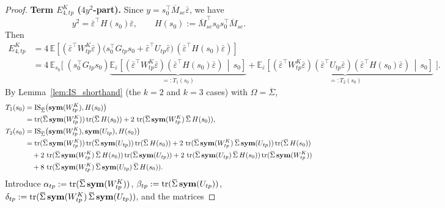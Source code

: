 \begin{proof}
\medskip
\noindent\textbf{Term $E^{K}_{4,tp}$ ($4y^2$-part).}
Since $y=s_0^\top\overline M_{se}\bar\varepsilon$, we have
\[
y^2=\bar\varepsilon^\top H(s_0)\bar\varepsilon,\qquad
H(s_0):=\overline M_{se}^\top s_0 s_0^\top\overline M_{se}.
\]
Then
\begin{align}
E^{K}_{4,tp}
&=4\,\mathbb E \left[(\bar\varepsilon^\top W^K_{tp}\bar\varepsilon)\Big(s_0^\top G_{tp}s_0+\bar\varepsilon^\top U_{tp}\bar\varepsilon\Big)\,(\bar\varepsilon^\top H(s_0)\bar\varepsilon)\right]\nonumber\\
&=4\,\mathbb E_{s_0} \Bigg[\;
(s_0^\top G_{tp}s_0)\underbrace{\mathbb E_{\bar\varepsilon}\left[(\bar\varepsilon^\top W^K_{tp}\bar\varepsilon)(\bar\varepsilon^\top H(s_0)\bar\varepsilon)\,\middle|\,s_0\right]}_{=:T_1(s_0)}
+\underbrace{\mathbb E_{\bar\varepsilon} \left[(\bar\varepsilon^\top W^K_{tp}\bar\varepsilon)(\bar\varepsilon^\top U_{tp}\bar\varepsilon)(\bar\varepsilon^\top H(s_0)\bar\varepsilon)\,\middle|\,s_0\right]}_{=:T_2(s_0)}
\;\Bigg].\label{eq:Dtp_cond_expand}
\end{align}
By Lemma~\ref{lem:IS_shorthand} (the $k=2$ and $k=3$ cases) with $\Omega=\overline\Sigma$,
\begin{align}
T_1(s_0)
&=\mathrm{IS}_{\overline\Sigma}\big(\symfun(W^K_{tp}),H(s_0)\big)\notag\\
&=\tr(\overline\Sigma\,\symfun(W^K_{tp}))\tr(\overline\Sigma\,H(s_0))
+2\,\tr(\overline\Sigma\,\symfun(W^K_{tp})\,\overline\Sigma\,H(s_0)),\label{eq:T1_expand}\\
T_2(s_0)
&=\mathrm{IS}_{\overline\Sigma}\big(\symfun(W^K_{tp}),\symfun(U_{tp}),H(s_0)\big)\notag\\
&=\tr(\overline\Sigma\,\symfun(W^K_{tp}))\tr(\overline\Sigma\,\symfun(U_{tp}))\tr(\overline\Sigma\,H(s_0))
+2\,\tr(\overline\Sigma\,\symfun(W^K_{tp})\,\overline\Sigma\,\symfun(U_{tp}))\tr(\overline\Sigma\,H(s_0))\notag\\
&\quad
+2\,\tr(\overline\Sigma\,\symfun(W^K_{tp})\,\overline\Sigma\,H(s_0))\tr(\overline\Sigma\,\symfun(U_{tp}))
+2\,\tr(\overline\Sigma\,\symfun(U_{tp})\,\overline\Sigma\,H(s_0))\tr(\overline\Sigma\,\symfun(W^K_{tp}))\notag\\
&\quad
+8\,\tr(\overline\Sigma\,\symfun(W^K_{tp})\,\overline\Sigma\,\symfun(U_{tp})\,\overline\Sigma\,H(s_0)).\label{eq:T2_expand}
\end{align}
Introduce $\alpha_{tp}:=\tr(\overline\Sigma\,\symfun(W^K_{tp}))$, $\beta_{tp}:=\tr(\overline\Sigma\,\symfun(U_{tp}))$,
$\delta_{tp}:=\tr(\overline\Sigma\,\symfun(W^K_{tp})\,\overline\Sigma\,\symfun(U_{tp}))$, and the matrices

\end{proof}
